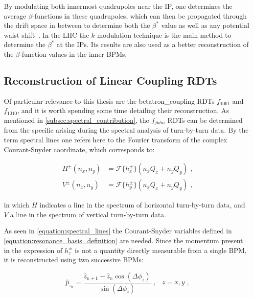By modulating both innermost quadrupoles near the IP, one determines the average \(\beta\)-functions in these quadrupoles, which can then be propagated through the drift space in between to determine both the \(\beta^{\ast}\) value as well as any potential waist shift~\cite{PRAB:Carlier:K_Modulation_HL_LHC}.
In the LHC the \(k\)-modulation technique is the main method to determine the \(\beta^{\ast}\) at the \glspl{IP}.
Its results are also used as a better reconstruction of the \(\beta\)-function values in the inner BPMs.

\subsection{Reconstruction of Linear Coupling RDTs}
\label{subsection:reconstruction_linear_coupling_rdts}

Of particular relevance to this thesis are the \gls{betatron_coupling} \glspl{RDT} \(f_{1001}\) and \(f_{1010}\), and it is worth spending some time detailing their reconstruction.
As mentioned in \cref{subsec:spectral_contribution}, the \(f_{jklm}\) RDTs can be determined from the specific  arising during the spectral analysis of turn-by-turn data.
By the term spectral lines one refers here to the Fourier transform of the complex Courant-Snyder coordinate, which corresponds to:

\begin{equation}
  \begin{aligned}
    H^\pm(n_x, n_y) &= \mathcal{F}\{h_x^\pm\}(n_x Q_x + n_y Q_y)  \text{ ,}  \\
    V^\pm(n_x, n_y) &= \mathcal{F}\{h_y^\pm\}(n_x Q_x + n_y Q_y)  \text{ ,}
  \end{aligned}
  \label{equation:spectral_lines}
\end{equation}
\vspace{0.1mm}

\noindent
in which \(H\) indicates a line in the spectrum of horizontal turn-by-turn data, and \(V\) a line in the spectrum of vertical turn-by-turn data.

As seen in \cref{equation:spectral_lines} the Courant-Snyder variables defined in \cref{equation:resonance_basis_definition} are needed.
Since the momentum present in the expression of \(h_z^\pm\) is not a quantity directly measurable from a single BPM, it is reconstructed using two successive BPMs:

\begin{equation}
  \hat{p}_{z_n} = \frac{\hat{z}_{n+1} - \hat{z}_n \cos \left(\Delta \phi_z\right)}{\sin \left(\Delta \phi_z\right)}  \text{ ,} \quad z = x, y \text{ ,}
  \label{equation:momentum_from_two_bpms}
\end{equation}
\vspace{1pt}

